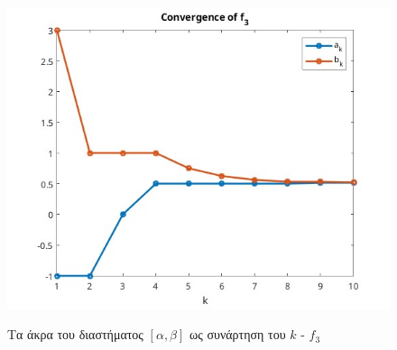 \begin{figure}[H]
    \includegraphics[scale=0.7]{plots/ex4/f3.jpg}
    \label{fig:funcs}
    \caption{Τα άκρα του διαστήματος $[\alpha, \beta]$ ως συνάρτηση του $k$ - $f_3$}
    \centering
\end{figure}